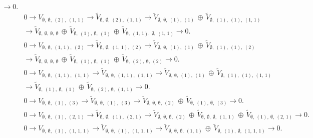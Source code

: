 \documentclass[openany, a4paper]{amsbook}
\theoremstyle{definition}
\numberwithin{equation}{chapter}
\begin{document}
\begin{align*}
\to 0.
\\ &
0 \to 
V_{ \emptyset, \ \emptyset, \ (2), \ (1,\,1) }\to
\tilde{V}_{ \emptyset, \ \emptyset, \ (2), \ (1,\,1) }
\to
\tilde{V}_{ \emptyset, \ \emptyset, \ (1), \ (1) }\,\oplus\,\tilde{V}_{ \emptyset, \ (1), \ (1), \ (1,\,1) }\\ &
\to
\tilde{V}_{ \emptyset, \ \emptyset, \ \emptyset, \ \emptyset }\,\oplus\,\tilde{V}_{ \emptyset, \ (1), \ \emptyset, \ (1) }\,\oplus\,\tilde{V}_{ \emptyset, \ (1,\,1), \ \emptyset, \ (1,\,1) }
\to 0.
\\ &
0 \to 
V_{ \emptyset, \ \emptyset, \ (1,\,1), \ (2) }\to
\tilde{V}_{ \emptyset, \ \emptyset, \ (1,\,1), \ (2) }
\to
\tilde{V}_{ \emptyset, \ \emptyset, \ (1), \ (1) }\,\oplus\,\tilde{V}_{ \emptyset, \ (1), \ (1), \ (2) }\\ &
\to
\tilde{V}_{ \emptyset, \ \emptyset, \ \emptyset, \ \emptyset }\,\oplus\,\tilde{V}_{ \emptyset, \ (1), \ \emptyset, \ (1) }\,\oplus\,\tilde{V}_{ \emptyset, \ (2), \ \emptyset, \ (2) }
\to 0.
\\ &
0 \to 
V_{ \emptyset, \ \emptyset, \ (1,\,1), \ (1,\,1) }\to
\tilde{V}_{ \emptyset, \ \emptyset, \ (1,\,1), \ (1,\,1) }
\to
\tilde{V}_{ \emptyset, \ \emptyset, \ (1), \ (1) }\,\oplus\,\tilde{V}_{ \emptyset, \ (1), \ (1), \ (1,\,1) }\\ &
\to
\tilde{V}_{ \emptyset, \ (1), \ \emptyset, \ (1) }\,\oplus\,\tilde{V}_{ \emptyset, \ (2), \ \emptyset, \ (1,\,1) }
\to 0.
\\ &
0 \to 
V_{ \emptyset, \ \emptyset, \ (1), \ (3) }\to
\tilde{V}_{ \emptyset, \ \emptyset, \ (1), \ (3) }
\to
\tilde{V}_{ \emptyset, \ \emptyset, \ \emptyset, \ (2) }\,\oplus\,\tilde{V}_{ \emptyset, \ (1), \ \emptyset, \ (3) }
\to 0.
\\ &
0 \to 
V_{ \emptyset, \ \emptyset, \ (1), \ (2,\,1) }\to
\tilde{V}_{ \emptyset, \ \emptyset, \ (1), \ (2,\,1) }
\to
\tilde{V}_{ \emptyset, \ \emptyset, \ \emptyset, \ (2) }\,\oplus\,\tilde{V}_{ \emptyset, \ \emptyset, \ \emptyset, \ (1,\,1) }\,\oplus\,\tilde{V}_{ \emptyset, \ (1), \ \emptyset, \ (2,\,1) }
\to 0.
\\ &
0 \to 
V_{ \emptyset, \ \emptyset, \ (1), \ (1,\,1,\,1) }\to
\tilde{V}_{ \emptyset, \ \emptyset, \ (1), \ (1,\,1,\,1) }
\to
\tilde{V}_{ \emptyset, \ \emptyset, \ \emptyset, \ (1,\,1) }\,\oplus\,\tilde{V}_{ \emptyset, \ (1), \ \emptyset, \ (1,\,1,\,1) }
\to 0.
\end{align*}

\backmatter


\end{document}
